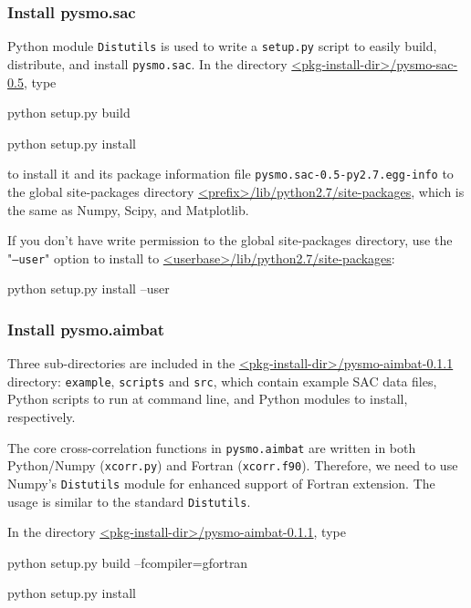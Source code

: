 \documentclass[12pt, titlepage]{article}
\newenvironment{lyxcode}
{\begin{list}{}{
\setlength{\rightmargin}{\leftmargin}
\setlength{\listparindent}{0pt}%
\raggedright
\setlength{\itemsep}{0pt}
\setlength{\parsep}{0pt}
\normalfont\ttfamily}%
 \item[]}
{\end{list}}
\begin{document}
\subsubsection{Install pysmo.sac}

Python module \texttt{Distutils} is used to write a \texttt{setup.py} script to easily build, distribute, and install \texttt{pysmo.sac}.
In the directory \url{<pkg-install-dir>/pysmo-sac-0.5}, type

\begin{lyxcode}
python setup.py build

python setup.py install
\end{lyxcode}

to install it and its package information file \texttt{pysmo.sac-0.5-py2.7.egg-info} to the global site-packages directory \url{<prefix>/lib/python2.7/site-packages}, which is the same as Numpy, Scipy, and Matplotlib.

If you don't have write permission to the global site-packages directory, use the "\texttt{--user}" option to install to
\url{<userbase>/lib/python2.7/site-packages}:

\begin{lyxcode}
python setup.py install --user
\end{lyxcode}


\subsubsection{Install pysmo.aimbat}

Three sub-directories are included in the \url{<pkg-install-dir>/pysmo-aimbat-0.1.1} directory: \texttt{example}, \texttt{scripts} and \texttt{src}, which contain example SAC data files, Python scripts to run at command line, and Python modules to install, respectively.


The core cross-correlation functions in \texttt{pysmo.aimbat} are written in both Python/Numpy (\texttt{xcorr.py}) and Fortran (\texttt{xcorr.f90}). 
Therefore, we need to use Numpy's \texttt{Distutils} module for enhanced support of Fortran extension. 
The usage is similar to the standard \texttt{Distutils}.

In the directory \url{<pkg-install-dir>/pysmo-aimbat-0.1.1}, type

\begin{lyxcode}
python setup.py build --fcompiler=gfortran

python setup.py install
\end{lyxcode}
\end{document}
